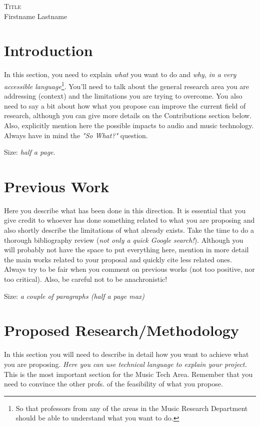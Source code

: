 \documentclass[12pt]{article}
\newcommand{\thetitle}{Title}
\begin{document}
\begin{center}
{\scshape\large \thetitle} \\
Firstname Lastname\\
\end{center}

\thispagestyle{empty}

\section*{Introduction}
In this section, you need to explain \emph{what} you want to do and  \emph{why}, \emph{in a very accessible language}\footnote{So that professors from any of the areas in the Music Research Department should be able to understand what you want to do. }.
You'll need to talk about the general research area you are addressing (context) and the limitations you are trying to overcome.
You also need to say a bit about how what you propose can improve the current field of research, although you can give more details on the Contributions section below. Also, explicitly mention here the possible impacts to audio and music technology.
Always have in mind the \emph{"So What?"} question.

Size: \emph{half a page}.

\section*{Previous Work}
Here you describe what has been done in this direction. 
It is essential that you give credit to whoever has done something related to what you are proposing and also shortly describe the limitations of what already exists. 
Take the time to do a thorough bibliography review (\emph{not only a quick Google search!}). Although you will probably not have the space to put everything here, mention in more detail the main works related to your proposal and quickly cite less related ones.
Always try to be fair when you comment on previous works (not too positive, nor too critical). Also, be careful not to be anachronistic!

Size: \emph{a couple of paragraphs (half a page max)}

\section*{Proposed Research/Methodology}
In this section you will need to describe in detail how you want to achieve what you are proposing. \emph{Here you can use technical language to explain your project.} 
This is the most important section for the Music Tech Area. Remember that you need to convince the other profs. of the feasibility of what you propose.
\end{document}
